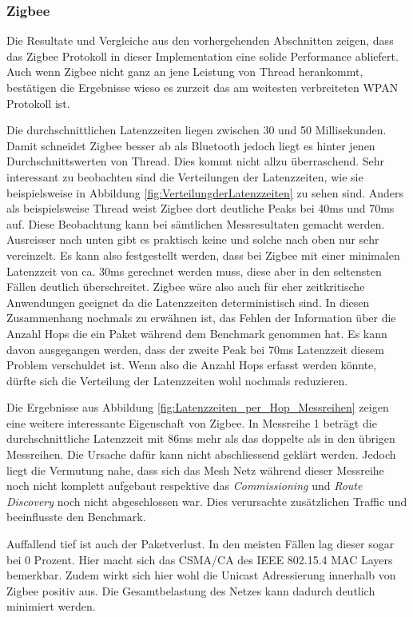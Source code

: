 \subsubsection{Zigbee}\label{subsubsec:FazitZigbee}
Die Resultate und Vergleiche aus den vorhergehenden Abschnitten zeigen, dass das Zigbee Protokoll in dieser Implementation eine solide Performance abliefert. Auch wenn Zigbee nicht ganz an jene Leistung von Thread herankommt, bestätigen die Ergebnisse wieso es zurzeit das am weitesten verbreiteten WPAN Protokoll ist.

Die durchschnittlichen Latenzzeiten liegen zwischen 30 und 50 Millisekunden. Damit schneidet Zigbee besser ab als Bluetooth jedoch liegt es hinter jenen Durchschnittswerten von Thread. Dies kommt nicht allzu überraschend. Sehr interessant zu beobachten sind die Verteilungen der Latenzzeiten, wie sie beispielsweise in Abbildung \ref{fig:VerteilungderLatenzzeiten} zu sehen sind. Anders als beispielsweise Thread weist Zigbee dort deutliche Peaks bei 40ms und 70ms auf. Diese Beobachtung kann bei sämtlichen Messresultaten gemacht werden. Ausreisser nach unten gibt es praktisch keine und solche nach oben nur sehr vereinzelt. Es kann also festgestellt werden, dass bei Zigbee mit einer minimalen Latenzzeit von ca. 30ms gerechnet werden muss, diese aber in den seltensten Fällen deutlich überschreitet. Zigbee wäre also auch für eher zeitkritische Anwendungen geeignet da die Latenzzeiten deterministisch sind. In diesen Zusammenhang nochmals zu erwähnen ist, das Fehlen der Information über die Anzahl Hops die ein Paket während dem Benchmark genommen hat. Es kann davon ausgegangen werden, dass der zweite Peak bei 70ms Latenzzeit diesem Problem verschuldet ist. Wenn also die Anzahl Hops erfasst werden könnte, dürfte sich die Verteilung der Latenzzeiten wohl nochmals reduzieren.

Die Ergebnisse aus Abbildung \ref{fig:Latenzzeiten_per_Hop_Messreihen} zeigen eine weitere interessante Eigenschaft von Zigbee. In Messreihe 1 beträgt die durchschnittliche Latenzzeit mit 86ms mehr als das doppelte als in den übrigen Messreihen. Die Ursache dafür kann nicht abschliessend geklärt werden. Jedoch liegt die Vermutung nahe, dass sich das Mesh Netz während dieser Messreihe noch nicht komplett aufgebaut respektive das \textit{Commissioning} und \textit{Route Discovery} noch nicht abgeschlossen war. Dies verursachte zusätzlichen Traffic und beeinflusste den Benchmark.

Auffallend tief ist auch der Paketverlust. In den meisten Fällen lag dieser sogar bei 0 Prozent. Hier macht sich das CSMA\slash CA des IEEE 802.15.4 MAC Layers bemerkbar. Zudem wirkt sich hier wohl die Unicast Adressierung innerhalb von Zigbee positiv aus. Die Gesamtbelastung des Netzes kann dadurch deutlich minimiert werden.

